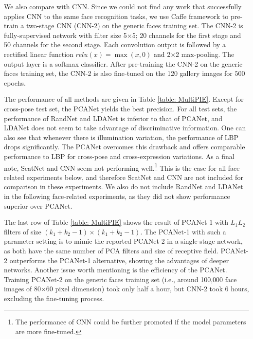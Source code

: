 \documentclass[10pt,journal,compsoc]{IEEEtran}
\begin{document}
We also compare with CNN. Since we could not find any work that successfully applies CNN to the same face recognition tasks, we use Caffe framework \cite{Jia13caffe} to pre-train a two-stage CNN (CNN-2) on the generic faces training set. The CNN-2 is fully-supervised network with filter size 5$\times$5; 20 channels for the first stage and 50 channels for the second stage. Each convolution output is followed by a rectified linear function $relu(x) = \max(x,0)$ and 2$\times$2 max-pooling. The output layer is a softmax classifier. After pre-training the CNN-2 on the generic faces training set, the CNN-2 is also fine-tuned on the 120 gallery images for $500$ epochs.

The performance of all methods are given in Table \ref{table: MultiPIE}. Except for cross-pose test set, the PCANet yields the best precision. For all test sets, the performance of RandNet and LDANet is inferior to that of PCANet, and LDANet does not seem to take advantage of discriminative information. One can also see that whenever there is illumination variation, the performance of LBP drops significantly. The PCANet overcomes this drawback and offers comparable performance to LBP for cross-pose and cross-expression variations. As a final note, ScatNet and CNN seem not performing well.\footnote{The performance of CNN could be further promoted if the model parameters are more fine-tuned.} This is the case for all face-related experiments below, and therefore ScatNet and CNN are not included for comparison in these experiments. We also do not include RandNet and LDANet in the following face-related experiments, as they did not show performance superior over PCANet.

The last row of Table \ref{table: MultiPIE} shows the result of PCANet-1 with $L_1L_2$ filters of size $(k_1 + k_2 -1) \times (k_1 + k_2 -1)$. The PCANet-1 with such a parameter setting is to mimic the reported PCANet-2 in a single-stage network, as both have the same number of PCA filters and size of receptive field. PCANet-2 outperforms the PCANet-1 alternative, showing the advantages of deeper networks. Another issue worth mentioning is the efficiency of the PCANet. Training PCANet-2 on the generic faces training set (i.e., around 100,000 face images of 80$\times$60 pixel dimension) took only half a hour, but CNN-2 took 6 hours, excluding the fine-tuning process.
\end{document}
